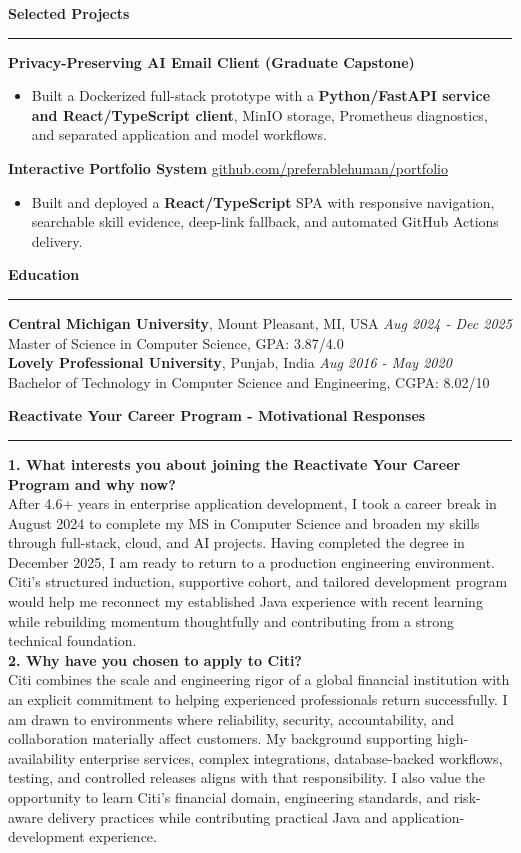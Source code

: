 \documentclass[11pt,letterpaper]{article}
\newcommand{\ressection}[1]{\Needspace{5\baselineskip}\vspace{8pt}\par\textbf{#1}\par\vspace{2pt}\hrule\vspace{5pt}}
\begin{document}
\ressection{Selected Projects}
\textbf{Privacy-Preserving AI Email Client (Graduate Capstone)}
\begin{itemize}
  \item Built a Dockerized full-stack prototype with a \textbf{Python/FastAPI service and React/TypeScript client}, MinIO storage, Prometheus diagnostics, and separated application and model workflows.
\end{itemize}
\textbf{Interactive Portfolio System} \hfill \href{https://github.com/preferablehuman/portfolio}{github.com/preferablehuman/portfolio}
\begin{itemize}
  \item Built and deployed a \textbf{React/TypeScript} SPA with responsive navigation, searchable skill evidence, deep-link fallback, and automated GitHub Actions delivery.
\end{itemize}

\ressection{Education}
\textbf{Central Michigan University}, Mount Pleasant, MI, USA \hfill \textit{Aug 2024 - Dec 2025}\\
Master of Science in Computer Science, GPA: 3.87/4.0\\[2pt]
\textbf{Lovely Professional University}, Punjab, India \hfill \textit{Aug 2016 - May 2020}\\
Bachelor of Technology in Computer Science and Engineering, CGPA: 8.02/10

\ressection{Reactivate Your Career Program - Motivational Responses}
\textbf{1. What interests you about joining the Reactivate Your Career Program and why now?}\\[2pt]
After 4.6+ years in enterprise application development, I took a career break in August 2024 to complete my MS in Computer Science and broaden my skills through full-stack, cloud, and AI projects. Having completed the degree in December 2025, I am ready to return to a production engineering environment. Citi's structured induction, supportive cohort, and tailored development program would help me reconnect my established Java experience with recent learning while rebuilding momentum thoughtfully and contributing from a strong technical foundation.\\[5pt]

\textbf{2. Why have you chosen to apply to Citi?}\\[2pt]
Citi combines the scale and engineering rigor of a global financial institution with an explicit commitment to helping experienced professionals return successfully. I am drawn to environments where reliability, security, accountability, and collaboration materially affect customers. My background supporting high-availability enterprise services, complex integrations, database-backed workflows, testing, and controlled releases aligns with that responsibility. I also value the opportunity to learn Citi's financial domain, engineering standards, and risk-aware delivery practices while contributing practical Java and application-development experience.\\[5pt]
\end{document}
